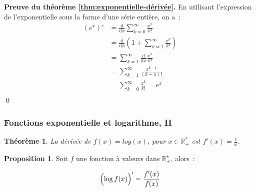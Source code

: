 \documentclass[10pt,notheorems]{beamer}
\theoremstyle{plain}
\newtheorem{theorem}{Théorème}
\theoremstyle{definition} %
\newtheorem{prop}{Proposition}
\begin{document}
\begin{notes}
  \medskip

  \textbf{Preuve du théorème \hyperlink{slide_derivee_exp_log_1}{\ref{thm:exponentielle-dérivée}}.} En utilisant l'expression de l'exponentielle sous la forme d'une série entière, on a~:
  \[
    \begin{split}
      \left( e^x \right)' &= \frac{\mathrm d}{\mathrm dx}\sum_{k=0}^\infty \frac{x^k}{k!}\\
                          &= \frac{\mathrm d}{\mathrm dx}\left(1+\sum_{k=1}^\infty \frac{x^k}{k!}\right)\\
                          &= \sum_{k=1}^\infty \frac{\mathrm d}{\mathrm dx}\frac{x^k}{k!}\\
                          &= \sum_{k=1}^\infty \frac{x^{k-1}}{(k-1)!}\\
                          &= \sum_{k=0}^\infty \frac{x^k}{k!} = e^x\\
    \end{split}
  \]
\qed
\end{notes}


\begin{frame}
  \frametitle{Fonctions exponentielle et logarithme, II}
  \hypertarget{slide_derivee_exp_log_1}{}

  \begin{theorem}\label{thm:log_derivee_1}
    La dérivée de $f(x) = log(x)$, pour $x\in\mathbb R_+^*$ est $f'(x) = \frac{1}{x}$.
  \end{theorem}

  \bigskip

  \begin{prop}\label{prop:log_derivee_2}
    Soit $f$ une fonction à valeurs dans $\mathbb R_+^{\star}$, alors~:

 \[
    \Bigl(\log f(x)\Bigr)' = \frac{f'(x)}{f(x)}
  \]
  \end{prop}

\end{frame}
\end{document}
